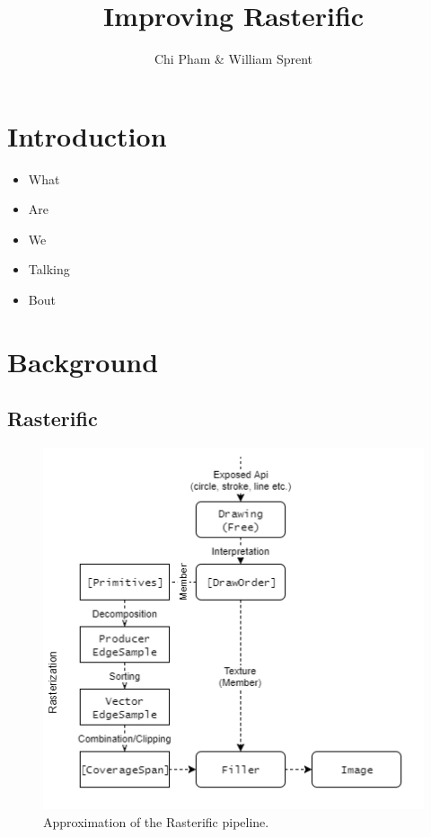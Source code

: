 \documentclass[12pt]{beamer}
\begin{document}
\author{Chi Pham \& William Sprent}
\title{Improving Rasterific}
\maketitle

\tableofcontents
\clearpage

\section{Introduction}
\begin{frame}
  \begin{itemize}
  \item What
  \item Are
  \item We
  \item Talking
  \item Bout
  \end{itemize}
\end{frame}
\section{Background}\label{background}
\subsection{Rasterific}
\begin{frame}
\begin{figure}[h!]
  \centering
  \includegraphics[width=.6\linewidth]{../rasterific-pipeline}
  \caption{Approximation of the Rasterific pipeline.}
  \label{fig:rasterific-pipeline}
\end{figure}
\end{frame}
\end{document}
